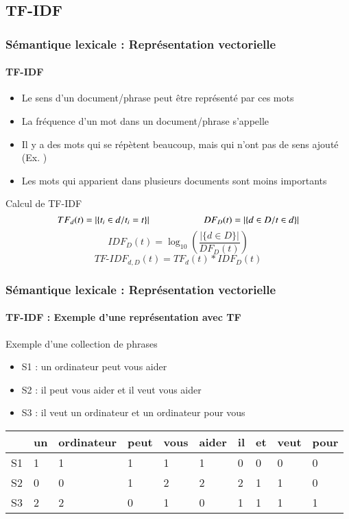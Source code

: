 \documentclass[xcolor=table]{beamer}
\begin{document}
\subsection{TF-IDF}

\begin{frame}
\frametitle{Sémantique lexicale : Représentation vectorielle}
\framesubtitle{TF-IDF}

\begin{itemize}
	\item Le sens d'un document/phrase peut être représenté par ces mots 
	\item La fréquence d'un mot dans un document/phrase s'appelle 
	\item Il y a des mots qui se répètent beaucoup, mais qui n'ont pas de sens ajouté (Ex. )
	\item Les mots qui apparient dans plusieurs documents sont moins importants
\end{itemize}

\begin{block}{Calcul de TF-IDF}
	\[
	TF_d(t) =  |\{t_i \in d / t_i = t\}|
	\hskip2cm 
	DF_D(t) = |\{d \in D / t \in d\}|
	\]
	\[IDF_D(t) = \log_{10} \left( \frac{|\{d \in D\}|}{DF_D(t)} \right)\]
	\[TF\text{-}IDF_{d, D}(t) = TF_d(t) * IDF_D(t)\]
\end{block}

\end{frame}


\begin{frame}
\frametitle{Sémantique lexicale : Représentation vectorielle}
\framesubtitle{TF-IDF : Exemple d'une représentation avec TF}

\begin{exampleblock}{Exemple d'une collection de phrases}
	\begin{itemize}
		\item S1 : un ordinateur peut vous aider
		\item S2 : il peut vous aider et il veut vous aider
		\item S3 : il veut un ordinateur et un ordinateur pour vous
	\end{itemize}
\end{exampleblock}

\begin{center}
	\begin{tabular}{llllllllll}
	\hline\hline
	& un & ordinateur & peut & vous & aider & il & et & veut & pour \\
	\hline
	S1 & 1 & 1 & 1 & 1 & 1 & 0 & 0 & 0 & 0\\
	S2 & 0 & 0 & 1 & 2 & 2 & 2 & 1 & 1 & 0\\
	S3 & 2 & 2 & 0 & 1 & 0 & 1 & 1 & 1 & 1\\
	\hline\hline
\end{tabular}
\end{center}

\end{frame}
\end{document}
